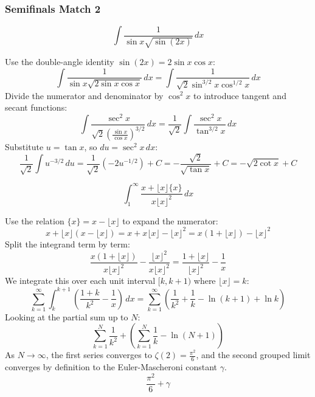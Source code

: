 \subsubsection*{Semifinals Match 2}
\begin{questions}
    \question
    \[ \int \frac{1}{\sin x \sqrt{\sin(2x)}} \, dx \]
    \begin{solution}
        Use the double-angle identity $\sin(2x) = 2\sin x \cos x$:
        \[ \int \frac{1}{\sin x \sqrt{2\sin x \cos x}} \, dx = \int \frac{1}{\sqrt{2} \sin^{3/2} x \cos^{1/2} x} \, dx \]
        Divide the numerator and denominator by $\cos^2 x$ to introduce tangent and secant functions:
        \[ \int \frac{\sec^2 x}{\sqrt{2} \left(\frac{\sin x}{\cos x}\right)^{3/2}} \, dx = \frac{1}{\sqrt{2}} \int \frac{\sec^2 x}{\tan^{3/2} x} \, dx \]
        Substitute $u = \tan x$, so $du = \sec^2 x \, dx$:
        \[ \frac{1}{\sqrt{2}} \int u^{-3/2} \, du = \frac{1}{\sqrt{2}} \left( -2u^{-1/2} \right) + C = -\frac{\sqrt{2}}{\sqrt{\tan x}} + C = -\sqrt{2\cot x} + C \]
    \end{solution}

    \question
    \[ \int_{1}^{\infty} \frac{x + \lfloor x \rfloor \{x\}}{x \lfloor x \rfloor^2} \, dx \]
    \begin{solution}
        Use the relation $\{x\} = x - \lfloor x \rfloor$ to expand the numerator:
        \[ x + \lfloor x \rfloor (x - \lfloor x \rfloor) = x + x\lfloor x \rfloor - \lfloor x \rfloor^2 = x(1 + \lfloor x \rfloor) - \lfloor x \rfloor^2 \]
        Split the integrand term by term:
        \[ \frac{x(1 + \lfloor x \rfloor)}{x \lfloor x \rfloor^2} - \frac{\lfloor x \rfloor^2}{x \lfloor x \rfloor^2} = \frac{1 + \lfloor x \rfloor}{\lfloor x \rfloor^2} - \frac{1}{x} \]
        We integrate this over each unit interval $[k, k+1)$ where $\lfloor x \rfloor = k$:
        \[ \sum_{k=1}^{\infty} \int_{k}^{k+1} \left( \frac{1 + k}{k^2} - \frac{1}{x} \right) \, dx = \sum_{k=1}^{\infty} \left( \frac{1}{k^2} + \frac{1}{k} - \ln(k+1) + \ln k \right) \]
        Looking at the partial sum up to $N$:
        \[ \sum_{k=1}^{N} \frac{1}{k^2} + \left( \sum_{k=1}^{N} \frac{1}{k} - \ln(N+1) \right) \]
        As $N \to \infty$, the first series converges to $\zeta(2) = \frac{\pi^2}{6}$, and the second grouped limit converges by definition to the Euler-Mascheroni constant $\gamma$. 
        \[ \frac{\pi^2}{6} + \gamma \]
    \end{solution}


\end{questions}
